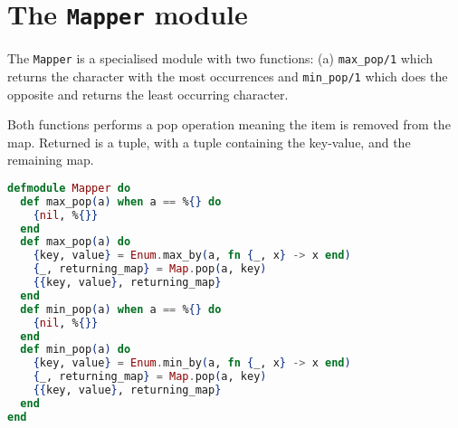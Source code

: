 \section{The \texttt{Mapper} module}
The \texttt{Mapper} is a specialised module with two functions: (a) \texttt{max\_pop/1} which returns the character with the most occurrences and \texttt{min\_pop/1} which does the opposite and returns the least occurring character.

Both functions performs a pop operation meaning the item is removed from the map. Returned is a tuple, with a tuple containing the key-value, and the remaining map.

\pagebreak
\begin{lstlisting}[language=Elixir, caption=Mapper module]
defmodule Mapper do
  def max_pop(a) when a == %{} do
    {nil, %{}}
  end
  def max_pop(a) do
    {key, value} = Enum.max_by(a, fn {_, x} -> x end)
    {_, returning_map} = Map.pop(a, key)
    {{key, value}, returning_map}
  end
  def min_pop(a) when a == %{} do
    {nil, %{}}
  end
  def min_pop(a) do
    {key, value} = Enum.min_by(a, fn {_, x} -> x end)
    {_, returning_map} = Map.pop(a, key)
    {{key, value}, returning_map}
  end
end
\end{lstlisting}